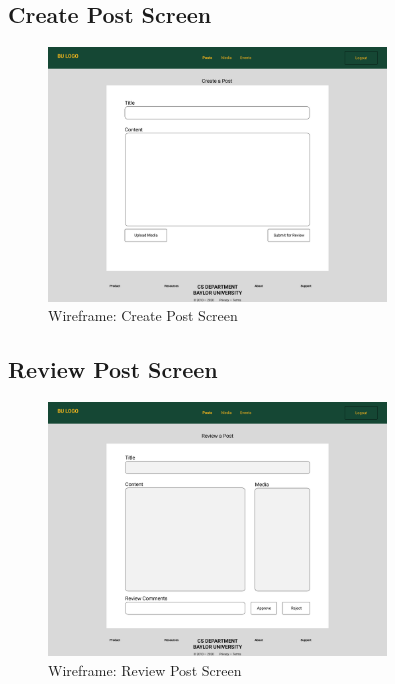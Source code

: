 \documentclass{article}
\begin{document}
\subsection{Create Post Screen}
\begin{figure}[H]
    \centering
    \includegraphics[width=0.8\textwidth]{images/wireframe_createPost.png}
    \centering
    \caption{Wireframe: Create Post Screen}
\end{figure}

\subsection{Review Post Screen}
\begin{figure}[H]
    \centering
    \includegraphics[width=0.8\textwidth]{images/wireframe_reviewPost.png}
    \centering
    \caption{Wireframe: Review Post Screen}
\end{figure}
\end{document}
